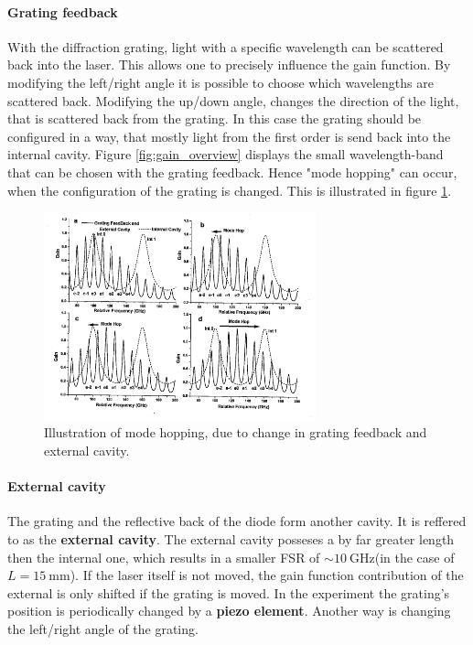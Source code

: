 \paragraph{Grating feedback}
With the diffraction grating, light with a specific wavelength
can be scattered back into the laser. This allows one to precisely
influence the gain function. By modifying the left/right angle
it is possible to choose which wavelengths are scattered back.
Modifying the up/down angle, changes the direction of the light,
that is scattered back from the grating.
In this case the grating
should be configured in a way, that mostly light from
the first order is send back into the internal cavity.
Figure \ref{fig:gain_overview}
displays the small wavelength-band that can be chosen with
the grating feedback. Hence  "mode hopping" can occur,
when the configuration of the grating is changed. This is illustrated
in figure \ref{fig:mode_hops}.


\FloatBarrier
\begin{figure}
  \centering
  \includegraphics[width=0.7\textwidth]{mode_hops.png}
  \caption{Illustration of mode hopping, due to change in grating feedback and external cavity.\cite{V61}}
  \label{fig:mode_hops}
\end{figure}
\FloatBarrier




\paragraph{External cavity}
The grating and the reflective back of the diode form another
cavity. It is reffered to as the \textbf{external cavity}.
The external cavity posseses a by far greater length then
the internal one, which results in a
smaller FSR of
$\sim \SI{10}{\giga\hertz}$(in the case of $L = \SI{15}{\milli\meter}$).
If the laser itself is not moved, the gain function
contribution of the external is only shifted if the grating
is moved. In the experiment the grating's position
is periodically changed by a \textbf{piezo element}. Another way is
changing the left/right angle of the grating.







